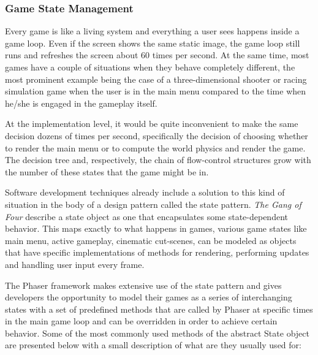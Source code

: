 \subsubsection{Game State Management}

Every game is like a living system and everything a user sees happens inside a
game loop. Even if the screen shows the same static image, the game loop still
runs and refreshes the screen about 60 times per second. At the same time, most
games have a couple of situations when they behave completely different, the
most prominent example being the case of a three-dimensional shooter or racing
simulation game when the user is in the main menu compared to the time when
he/she is engaged in the gameplay itself.

At the implementation level, it would be quite inconvenient to make the same
decision dozens of times per second, specifically the decision of choosing
whether to render the main menu or to compute the world physics and render the
game. The decision tree and, respectively, the chain of flow-control structures
grow with the number of these states that the game might be in.

Software development techniques already include a solution to this kind of
situation in the body of a design pattern called the state pattern. \emph{The
Gang of Four}\cite{gof} describe a state object as one that encapsulates some
state-dependent behavior. This maps exactly to what happens in games, various
game states like main menu, active gameplay, cinematic cut-scenes, can be
modeled as objects that have specific implementations of methods for
rendering, performing updates and handling user input every frame.

The Phaser framework makes extensive use of the state pattern and gives
developers the opportunity to model their games as a series of interchanging
states with a set of predefined methods that are called by Phaser at specific
times in the main game loop and can be overridden in order to achieve certain
behavior. Some of the most commonly used methods of the abstract State object
are presented below with a small description of what are they usually used for:


